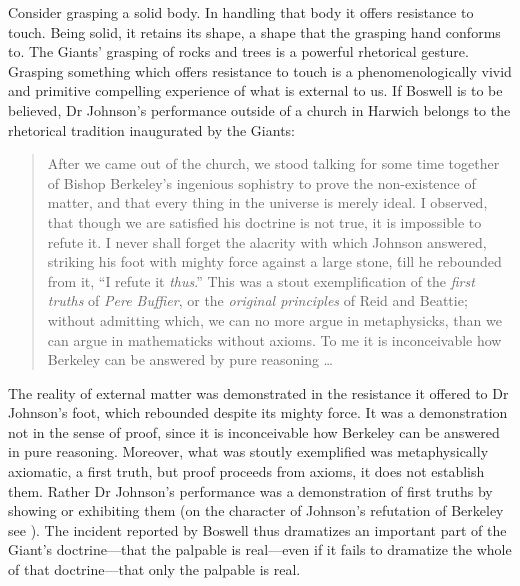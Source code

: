 Consider grasping a solid body. In handling that body it offers resistance to touch. Being solid, it retains its shape, a shape that the grasping hand conforms to. The Giants' grasping of rocks and trees is a powerful rhetorical gesture. Grasping something which offers resistance to touch is a phenomenologically vivid and primitive compelling experience of what is external to us. If Boswell is to be believed, Dr Johnson's performance outside of a church in Harwich belongs to the rhetorical tradition inaugurated by the Giants: 
\begin{quote}
	After we came out of the church, we stood talking for some time together of Bishop Berkeley's ingenious sophistry to prove the non-exist\-ence of matter, and that every thing in the universe is merely ideal. I observed, that though we are satisfied his doctrine is not true, it is impossible to refute it. I never shall forget the alacrity with which Johnson answered, striking his foot with mighty force against a large stone, \'till he rebounded from it, ``I refute it \emph{thus}.'' This was a stout exemplification of the \emph{first truths} of \emph{Pere Buffier}, or the \emph{original principles} of Reid and Beattie; without admitting which, we can no more argue in metaphysicks, than we can argue in mathematicks without axioms. To me it is inconceivable how Berkeley can be answered by pure reasoning \ldots\ \citep[\textsc{i} 471]{Boswell:1935fk}
\end{quote}
The reality of external matter was demonstrated in the resistance it offered to Dr Johnson's foot, which rebounded despite its mighty force. It was a demonstration not in the sense of proof, since it is inconceivable how Berkeley can be answered in pure reasoning. Moreover, what was stoutly exemplified was metaphysically axiomatic, a first truth, but proof proceeds from axioms, it does not establish them. Rather Dr Johnson's performance was a demonstration of first truths by showing or exhibiting them (on the character of Johnson's refutation of Berkeley see \citealt{Patey:1986uq}). The incident reported by Boswell thus dramatizes an important part of the Giant's doctrine---that the palpable is real---even if it fails to dramatize the whole of that doctrine---that only the palpable is real.
 
